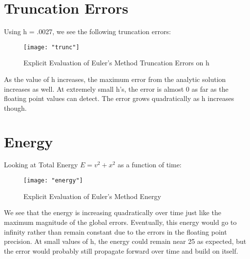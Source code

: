 \documentclass{article}
\begin{document}
\section{Truncation Errors}
Using h = .0027, we see the following truncation errors:
\begin{figure}[h!]
	\centering
	\texttt{[image: "trunc"]}
	\caption{Explicit Evaluation of Euler's Method Truncation Errors on h}
\end{figure} 
\FloatBarrier

As the value of h increases, the maximum error from the analytic solution increases as well. At extremely small h's, the error is almost 0 as far as the
floating point values can detect. The error grows quadratically as h increases though.

\section{Energy}
Looking at Total Energy $E = v^2 + x^2$ as a function of time:
\begin{figure}[h!]
	\centering
	\texttt{[image: "energy"]}
	\caption{Explicit Evaluation of Euler's Method Energy}
\end{figure} 
\FloatBarrier
We see that the energy is increasing quadratically over time just like the maximum magnitude of the global errors. Eventually, this energy would go to 
infinity rather than remain constant due to the errors in the floating point precision. At small values of h, the energy could remain near 25 as expected,
but the error would probably still propagate forward over time and build on itself.
\end{document}
